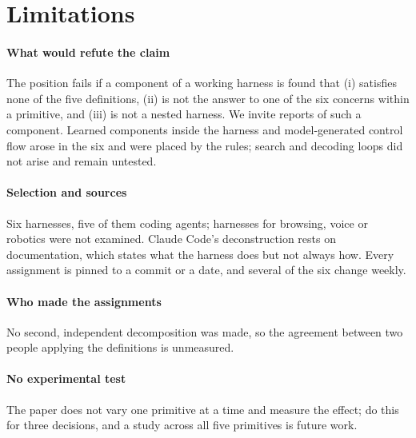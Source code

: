 \section{Limitations}
\label{sec:limitations}
\paragraph{What would refute the claim} The position fails if a component of a working harness is found that (i) satisfies none of the five definitions, (ii) is not the answer to one of the six concerns within a primitive, and (iii) is not a nested harness. We invite reports of such a component. Learned components inside the harness and model-generated control flow arose in the six and were placed by the rules; search and decoding loops did not arise and remain untested.

\paragraph{Selection and sources} Six harnesses, five of them coding agents; harnesses for browsing, voice or robotics were not examined. Claude Code's deconstruction rests on documentation, which states what the harness does but not always how. Every assignment is pinned to a commit or a date, and several of the six change weekly.

\paragraph{Who made the assignments} No second, independent decomposition was made, so the agreement between two people applying the definitions is unmeasured.

\paragraph{No experimental test} The paper does not vary one primitive at a time and measure the effect; \cite{fan2026empirical} do this for three decisions, and a study across all five primitives is future work.
